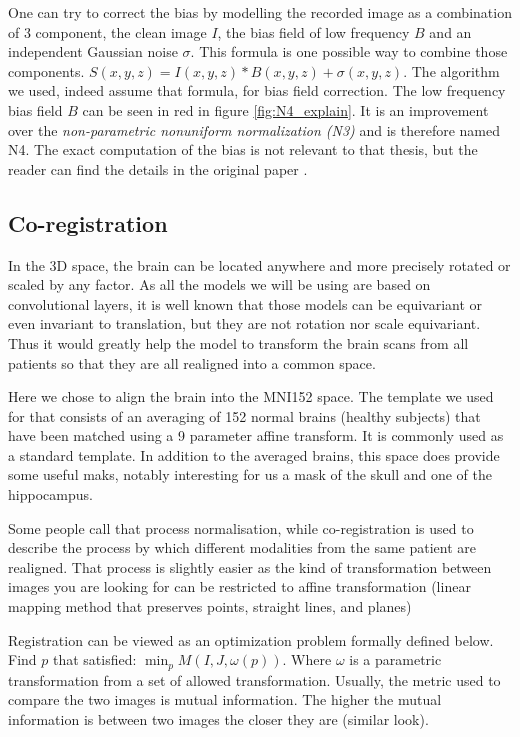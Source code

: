 One can try to correct the bias by modelling the recorded image as a combination of 3 component, the clean image $I$, the bias field of low frequency $B$ and an independent Gaussian noise $\sigma$. This formula is one possible way to combine those components. $S(x,y,z)= I(x,y,z)*B(x,y,z) +\sigma(x,y,z)$. The algorithm we used, indeed assume that formula, for bias field correction. The low frequency bias field $B$ can be seen in red in figure \ref{fig:N4_explain}. It is an improvement over the \textit{non-parametric nonuniform normalization (N3)} and is therefore named N4. 
The exact computation of the bias is not relevant to that thesis, but the reader can find the details in the original paper \cite{N4_paper}.


\subsection{Co-registration}
\label{sec:coregistration}

In the 3D space, the brain can be located anywhere and more precisely rotated or scaled by any factor. As all the models we will be using are based on convolutional layers, it is well known that those models can be equivariant or even invariant to translation, but they are not rotation nor scale equivariant. Thus it would greatly help the model to transform the brain scans from all patients so that they are all realigned into a common space. 

Here we chose to align the brain into the MNI152 space\footnotemark{}. The template we used for that consists of an averaging of 152 normal brains (healthy subjects) that have been matched using a 9 parameter affine transform. It is commonly used as a standard template. In addition to the averaged brains, this space does provide some useful maks, notably interesting for us a mask of the skull and one of the hippocampus.

Some people call that process normalisation, while co-registration is used to describe the process by which different modalities from the same patient are realigned. That process is slightly easier as the kind of transformation between images you are looking for can be restricted to affine transformation (linear mapping method that preserves points, straight lines, and planes)

Registration can be viewed as an optimization problem formally defined below.
Find $p$ that satisfied:  $\displaystyle  \min_{p} M(I,J, \omega(p))$. Where $\omega$ is a parametric transformation from a set of allowed transformation. Usually, the metric used to compare the two images is mutual information. The higher the mutual information is between two images the closer they are (similar look).

